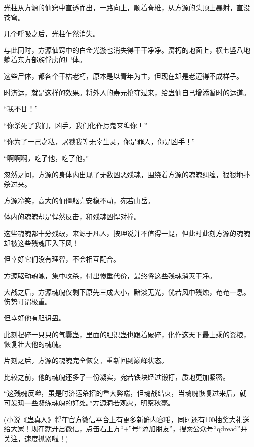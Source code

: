 \begin{this_body}
光柱从方源的仙窍中直透而出，一路向上，顺着脊椎，从方源的头顶上暴射，直没苍穹。

几个呼吸之后，光柱乍然消失。

与此同时，方源仙窍中的白金光漩也消失得干干净净。腐朽的地面上，横七竖八地躺着东方部族俘虏的尸体。

这些尸体，都各个干枯老朽，原本是以青年为主，但现在却是老迈得不成样子。

时济运，就是这样的效果。将外人的寿元抢夺过来，给蛊仙自己增添暂时的运道。

“我不甘！”

“你杀死了我们，凶手，我们化作厉鬼来缠你！”

“你为了一己之私，屠戮我等无辜生灵，你是罪人，你是凶手！”

“啊啊啊，吃了他，吃了他。”

忽然之间，方源的身体内出现了无数凶恶残魂，围绕着方源的魂魄纠缠，狠狠地扑杀过来。

方源冷笑，高大的仙僵躯壳安稳不动，宛若山岳。

体内的魂魄却是悍然反击，和残魂凶悍对撞。

这些魂魄都十分残破，来源于凡人，按理说并不值得一提，但此时此刻方源的魂魄却被这些残魂压入下风！

但幸好它们没有理智，不会相互配合。

方源驱动魂魄，集中攻杀，付出惨重代价，最终将这些残魂消灭干净。

大战之后，方源魂魄仅剩下原先三成大小，黯淡无光，恍若风中残烛，奄奄一息。伤势可谓极重。

但幸好他有胆识蛊。

此刻捏碎一只只的气囊蛊，里面的胆识蛊也跟着破碎，化作这天下最上乘的资粮，恢复壮大他的魂魄。

片刻之后，方源的魂魄完全恢复，重新回到巅峰状态。

比较之前，他的魂魄还多了一份凝实，宛若铁块经过锻打，质地更加紧密。

“这残魂反噬，虽是时济运杀招的重大弊端，但魂战结束，当魂魄恢复过来后，就可发现一些凝练魂魄的好处。”方源洞若观火，明察秋毫。

(小说《蛊真人》将在官方微信平台上有更多新鲜内容哦，同时还有100抽奖大礼送给大家！现在就开启微信，点击右上方“+”号“添加朋友”，搜索公众号“qdread”并关注，速度抓紧啦！)

\end{this_body}

